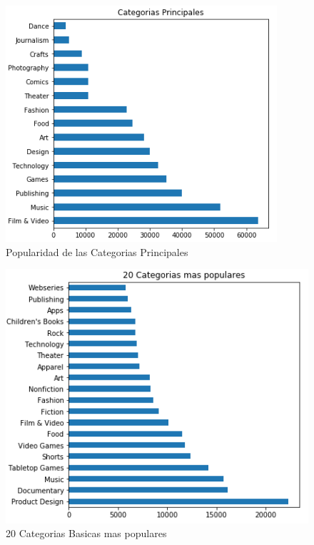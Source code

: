 \documentclass[journal]{IEEEtran}
\begin{document}
\begin{figure}[H]
    \centering
    \captionsetup{justification=centering}
    \includegraphics[width=\linewidth]{Images/Categorias.PNG}
    \caption{Popularidad de las Categorias Principales}
\end{figure}

\begin{figure}[H]
    \centering
    \captionsetup{justification=centering}
\includegraphics[width=\linewidth]{Images/40Categorias.PNG}
    \caption{20 Categorias Basicas mas populares}
\end{figure}
\end{document}
